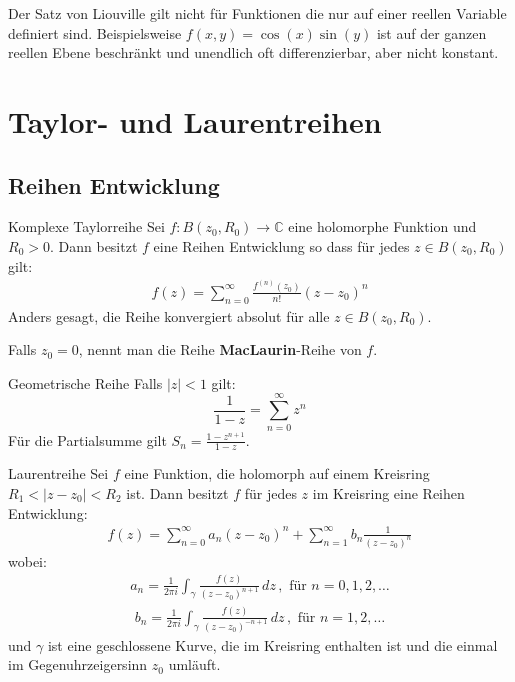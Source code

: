 \documentclass[a4paper,10pt]{article}
\begin{document}
Der Satz von Liouville gilt nicht für Funktionen die nur auf einer reellen Variable definiert sind. Beispielsweise $f(x, y) = \cos(x) \sin(y)$ ist auf der ganzen reellen Ebene beschränkt und unendlich oft differenzierbar, aber nicht konstant.

\section{Taylor- und Laurentreihen}

\subsection{Reihen Entwicklung}

\begin{mainbox}{Komplexe Taylorreihe}
  Sei \( f \colon B(z_0,R_0) \to \mathbb{C}\) eine holomorphe Funktion und \( R_0 > 0 \). Dann besitzt \(f\) eine Reihen Entwicklung so dass für jedes  \(z\in B(z_0,R_0)\) gilt: \begin{align*} f(z) = \sum_{n=0}^{\infty} \frac{f^{( n )}(z_0)}{n!} (z-z_0)^n \end{align*} Anders gesagt, die Reihe konvergiert absolut für alle \( z\in B(z_0,R_0)\).
\end{mainbox}

Falls $z_0 = 0$, nennt man die Reihe \textbf{MacLaurin}-Reihe von $f$. 

\begin{subbox}{Geometrische Reihe}
  Falls $|z| < 1$ gilt:
  $$
    \frac{1}{1 - z} = \sum_{n=0}^\infty z^n
  $$
  Für die Partialsumme gilt $S_n = \frac{1 - z^{n+1}}{1 - z}$.
\end{subbox}

\begin{mainbox}{Laurentreihe}
  Sei \(f\) eine Funktion, die holomorph auf einem Kreisring \( R_1 <|z-z_0| < R_2 \) ist. Dann besitzt \(f\) für jedes \(z\) im Kreisring eine Reihen Entwicklung:
  \begin{align*} f(z)=\sum_{n=0}^\infty a_n(z-z_0)^n+\sum_{n=1}^\infty b_n\frac{1}{(z-z_0)^n}\end{align*}
  wobei:
  \begin{align*} a_n=\frac{1}{2\pi i}\int_\gamma\frac{f(z)}{(z-z_0)^{n+1}}\,dz\,,\text{ für } n=0,1,2,\dots\end{align*} \begin{align*}b_n=\frac{1}{2\pi i}\int_\gamma\frac{f(z)}{(z-z_0)^{-n+1}}\,dz\,,\text{ für } n=1,2,\dots \end{align*} und \(\gamma\) ist eine geschlossene Kurve, die im Kreisring enthalten ist und die einmal im Gegenuhrzeigersinn \(z_0\) umläuft.
\end{mainbox}
\end{document}
